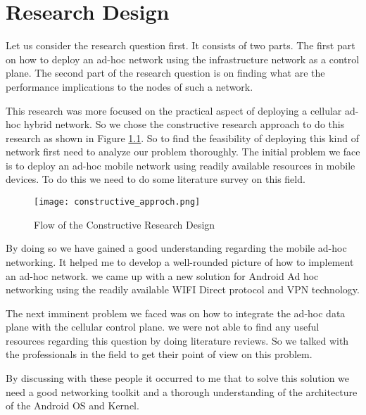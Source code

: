 
\chapter[Design]{Research Design}
\vspace{12pt}
Let us consider the research question first. It consists of two parts. The first part on how to deploy an ad-hoc network using the infrastructure network as a control plane. The second part of the research question is on finding what are the performance implications to the nodes of such a network.



\vspace{12pt}

This research was more focused on the practical aspect of deploying a cellular ad-hoc hybrid network. So we chose the constructive research approach to do this research as shown in Figure \ref{fig:pca_w_WW_coeff_z}. So to find the feasibility of deploying this kind of network first need to analyze our problem thoroughly. The initial problem we face is to deploy an ad-hoc mobile network using readily available resources in mobile devices. To do this we need to do some literature survey on this field.

\begin{figure}[H]
    \centering
    \texttt{[image: constructive\_approch.png]}
    \caption{Flow of the Constructive Research Design }
    \label{fig:pca_w_WW_coeff_z}
\end{figure}
\vspace{12pt}

By doing so we have gained a good understanding regarding the mobile ad-hoc networking. It helped me to develop a well-rounded picture of how to implement an ad-hoc network. we came up with a new solution for Android Ad hoc networking using the readily available WIFI Direct protocol and VPN technology.

\vspace{12pt}

The next imminent problem we faced was on how to integrate the ad-hoc data plane with the cellular control plane. we were not able to find any useful resources regarding this question by doing literature reviews. So we talked with the professionals in the field to get their point of view on this problem.

\vspace{12pt}


By discussing with these people it occurred to me that to solve this solution we need a good networking toolkit and a thorough understanding of the architecture of the Android OS and Kernel.


